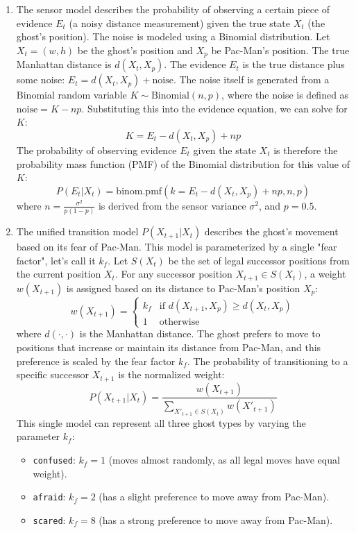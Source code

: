 \documentclass{article}
\begin{document}
\begin{enumerate}[label=\alph*.,leftmargin=*]
    \item The sensor model describes the probability of observing a certain piece of evidence $E_t$ (a noisy distance measurement) given the true state $X_t$ (the ghost's position). The noise is modeled using a Binomial distribution. Let $X_t = (w, h)$ be the ghost's position and $X_p$ be Pac-Man's position. The true Manhattan distance is $d(X_t, X_p)$. The evidence $E_t$ is the true distance plus some noise: $E_t = d(X_t, X_p) + \text{noise}$. The noise itself is generated from a Binomial random variable $K \sim \text{Binomial}(n, p)$, where the noise is defined as $\text{noise} = K - np$. Substituting this into the evidence equation, we can solve for $K$:
    $$ K = E_t - d(X_t, X_p) + np $$
    The probability of observing evidence $E_t$ given the state $X_t$ is therefore the probability mass function (PMF) of the Binomial distribution for this value of $K$:
    $$ P(E_t | X_t) = \text{binom.pmf}(k=E_t - d(X_t, X_p) + np, n, p) $$
    where $n = \frac{\sigma^2}{p(1-p)}$ is derived from the sensor variance $\sigma^2$, and $p=0.5$.
    \item The unified transition model $P(X_{t+1} | X_t)$ describes the ghost's movement based on its fear of Pac-Man. This model is parameterized by a single "fear factor", let's call it $k_f$. Let $S(X_t)$ be the set of legal successor positions from the current position $X_t$. For any successor position $X_{t+1} \in S(X_t)$, a weight $w(X_{t+1})$ is assigned based on its distance to Pac-Man's position $X_p$:
    $$
    w(X_{t+1}) =
    \begin{cases}
        k_f & \text{if } d(X_{t+1}, X_p) \ge d(X_t, X_p) \\
        1 & \text{otherwise}
    \end{cases}
    $$
    where $d(\cdot, \cdot)$ is the Manhattan distance. The ghost prefers to move to positions that increase or maintain its distance from Pac-Man, and this preference is scaled by the fear factor $k_f$. The probability of transitioning to a specific successor $X_{t+1}$ is the normalized weight:
    $$ P(X_{t+1} | X_t) = \frac{w(X_{t+1})}{\sum_{X'_{t+1} \in S(X_t)} w(X'_{t+1})} $$
    This single model can represent all three ghost types by varying the parameter $k_f$:
    \begin{itemize}
        \item \texttt{confused}: $k_f = 1$ (moves almost randomly, as all legal moves have equal weight).
        \item \texttt{afraid}: $k_f = 2$ (has a slight preference to move away from Pac-Man).
        \item \texttt{scared}: $k_f = 8$ (has a strong preference to move away from Pac-Man).
    \end{itemize}
\end{enumerate}
\end{document}
